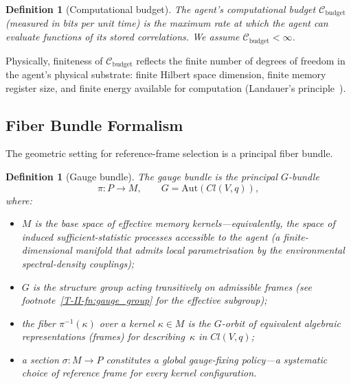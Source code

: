 \documentclass[12pt,a4paper,openany]{book}
\newtheorem{definition}[theorem]{Definition}
\begin{document}
\begin{definition}[Computational budget]
\label{T-II-def:budget}
The agent's \emph{computational budget}
$\mathcal{C}_{\mathrm{budget}}$ (measured in bits per unit
time) is the maximum rate at which the agent can evaluate
functions of its stored correlations.
We assume $\mathcal{C}_{\mathrm{budget}} < \infty$.
\end{definition}

Physically, finiteness of $\mathcal{C}_{\mathrm{budget}}$
reflects the finite number of degrees of freedom in the
agent's physical substrate: finite Hilbert space dimension,
finite memory register size, and finite energy available for
computation (Landauer's
principle~\cite{Landauer1961,Bennett1982}).

\subsection{Fiber Bundle Formalism}
\label{T-II-subsec:fiber}

The geometric setting for reference-frame selection is a
principal fiber bundle.

\begin{definition}[Gauge bundle]
\label{T-II-def:bundle}
The \emph{gauge bundle} is the principal $G$-bundle
\begin{equation}
\label{T-II-eq:bundle}
\pi: P \to M, \qquad G = \mathrm{Aut}(Cl(V,q)),
\end{equation}
where:
\begin{itemize}
\item $M$ is the base space of \emph{effective memory
  kernels}---equivalently, the space of induced
  sufficient-statistic processes accessible to the agent
  (a finite-dimensional manifold that admits local
  parametrisation by the environmental spectral-density
  couplings);
\item $G$ is the structure group acting transitively on
  admissible frames (see
  footnote~\ref{T-II-fn:gauge_group} for the effective
  subgroup);
\item the fiber $\pi^{-1}(\kappa)$ over a kernel
  $\kappa \in M$ is the $G$-orbit of equivalent algebraic
  representations (frames) for describing~$\kappa$
  in $Cl(V,q)$;
\item a \emph{section} $\sigma: M \to P$ constitutes a
  global gauge-fixing policy---a systematic choice
  of reference frame for every kernel configuration.
\end{itemize}
\end{definition}
\end{document}
